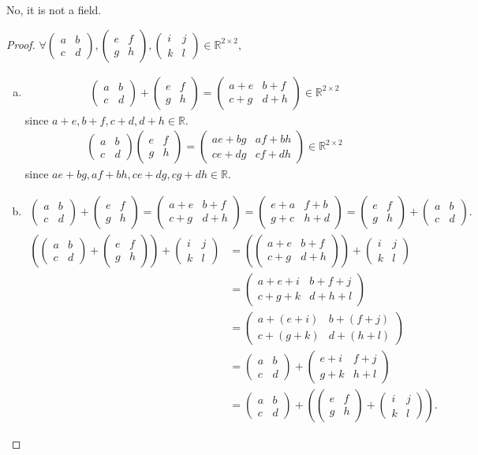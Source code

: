 \documentclass{amsart}
\newcommand{\bbr}{\mathbb{R}}
\newcommand{\aaa}{\left(\begin{smallmatrix}a&b\\c&d\end{smallmatrix}\right)}
\newcommand{\bbb}{\left(\begin{smallmatrix}e&f\\g&h\end{smallmatrix}\right)}
\newcommand{\ccc}{\left(\begin{smallmatrix}i&j\\k&l\end{smallmatrix}\right)}
\theoremstyle{plain}
\theoremstyle{definition}
\begin{document}
No, it is not a field.\\
\begin{proof}
$\forall \left(\begin{smallmatrix}a&b\\c&d\end{smallmatrix}\right), \left(\begin{smallmatrix}e&f\\g&h\end{smallmatrix}\right),\left(\begin{smallmatrix}i&j\\k&l\end{smallmatrix}\right) \in \bbr^{2\times 2}$,
	\begin{enumerate}[(a)]
		\item 
			\begin{align*}
			\aaa + \bbb = \left(\begin{smallmatrix}a+e&b+f\\c+g&d+h\end{smallmatrix}\right) \in \bbr^{2\times 2}
			\end{align*}
			since $a+e,b+f,c+d,d+h \in \bbr$.
			\begin{align*}
			\aaa\bbb = \left(\begin{smallmatrix}ae+bg&af+bh\\ce+dg&cf+dh\end{smallmatrix}\right) \in \bbr^{2\times 2}
			\end{align*}
            since $ae+bg,af+bh,ce+dg,cg+dh \in \bbr$.
		\item
			\begin{align*}
				\aaa + \bbb = \left(\begin{smallmatrix}a+e&b+f\\c+g&d+h\end{smallmatrix}\right) = \left(\begin{smallmatrix}e+a&f+b\\g+c&h+d\end{smallmatrix}\right) = \bbb + \aaa.
			\end{align*}
			\begin{align*}
	    	\left(\aaa + \bbb\right) + \ccc &= \left( \left(\begin{smallmatrix}a+e&b+f\\c+g&d+h\end{smallmatrix}\right) \right) + \ccc \\&= \left(\begin{smallmatrix}a+e+i&b+f+j\\c+g+k&d+h+l\end{smallmatrix}\right) \\ &= \left(\begin{smallmatrix}a+(e+i)&b+(f+j)\\c+(g+k)&d+(h+l)\end{smallmatrix}\right) \\&= \aaa +  \left(\begin{smallmatrix}e+i&f+j\\g+k&h+l\end{smallmatrix}\right) \\ &= \aaa+\left(\bbb+\ccc\right).

\end{align*}
\end{enumerate}
\end{proof}
\end{document}
